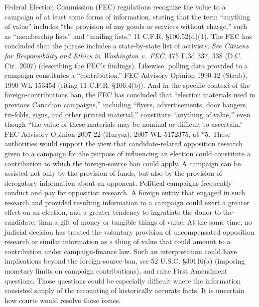 Federal Election Commission (FEC) regulations recognize the value to a campaign of at least some forms of information, stating that the term ``anything of value'' includes ``the provision of any goods or services without charge,'' such as ``membership lists'' and ``mailing lists.''
11 C.F.R. \S 100.52(d)(1).
The FEC has concluded that the phrase includes a state-by-state list of activists.
\textit{See Citizens for Responsibility and Ethics in Washington v.\ FEC}, 475 F.3d 337, 338 (D.C. Cir.~2007) (describing the FEC's findings).
Likewise, polling data provided to a campaign constitutes a ``contribution.''
FEC Advisory Opinion 1990-12 (Strub), 1990 WL 153454 (citing 11 C.F.R. \S 106.4(b)).
And in the specific context of the foreign-contributions ban, the FEC has concluded that ``election materials used in previous Canadian campaigns,'' including ``flyers, advertisements, door hangers, tri-folds, signs, and other printed material,'' constitute ``anything of value,'' even though ``the value of these materials may be nominal or difficult to ascertain.''
FEC Advisory Opinion 2007-22 (Hurysz), 2007 WL 5172375, at $\ast$5.
These authorities would support the view that candidate-related opposition research given to a campaign for the purpose of influencing an election could constitute a contribution to which the foreign-source ban could apply.
A campaign can be assisted not only by the provision of funds, but also by the provision of derogatory information about an opponent.
Political campaigns frequently conduct and pay for opposition research.
A foreign entity that engaged in such research and provided resulting information to a campaign could exert a greater effect on an election, and a greater tendency to ingratiate the donor to the candidate, than a gift of money or tangible things of value.
At the same time, no judicial decision has treated the voluntary provision of uncompensated opposition research or similar information as a thing of value that could amount to a contribution under campaign-finance law.
Such an interpretation could have implications beyond the foreign-source ban, see 52 U.S.C. \S 30116(a) (imposing monetary limits on campaign contributions), and raise First Amendment questions.
Those questions could be especially difficult where the information consisted simply of the recounting of historically accurate facts.
It is uncertain how courts would resolve those issues.


